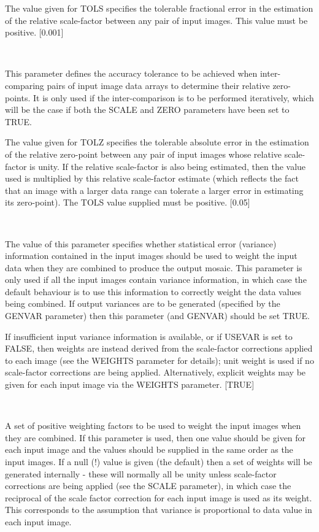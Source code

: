 \documentclass[twoside,11pt]{article}
\renewcommand{\_}{\texttt{\symbol{95}}}
\newcommand{\sstsubsection}[1]{ \item[{#1}] \mbox{} \\}
\newcommand{\sstsubsection}[1]{\item[{#1}]}
\begin{document}
{{{         The value given for TOLS specifies the tolerable fractional
         error in the estimation of the relative scale-factor between
         any pair of input images. This value must be positive.
         [0.001]
      }
      \sstsubsection{
         TOLZ = \_REAL (Read)
      } {
         This parameter defines the accuracy tolerance to be achieved
         when inter-comparing pairs of input image data arrays to
         determine their relative zero-points. It is only used if the
         inter-comparison is to be performed iteratively, which will be
         the case if both the SCALE and ZERO parameters have been set
         to TRUE.

         The value given for TOLZ specifies the tolerable absolute
         error in the estimation of the relative zero-point between any
         pair of input images whose relative scale-factor is unity. If
         the relative scale-factor is also being estimated, then the
         value used is multiplied by this relative scale-factor
         estimate (which reflects the fact that an image with a larger
         data range can tolerate a larger error in estimating its
         zero-point). The TOLS value supplied must be positive.
         [0.05]
      }
      \sstsubsection{
         USEVAR = \_LOGICAL (Read)
      } {
         The value of this parameter specifies whether statistical
         error (variance) information contained in the input images
         should be used to weight the input data when they are combined
         to produce the output mosaic. This parameter is only used if
         all the input images contain variance information, in which case
         the default behaviour is to use this information to correctly
         weight the data values being combined. If output variances are
         to be generated (specified by the GENVAR parameter) then this
         parameter (and GENVAR) should be set TRUE.

         If insufficient input variance information is available, or if
         USEVAR is set to FALSE, then weights are instead derived from
         the scale-factor corrections applied to each image (see the
         WEIGHTS parameter for details); unit weight is used if no
         scale-factor corrections are being applied. Alternatively,
         explicit weights may be given for each input image via the
         WEIGHTS parameter.
         [TRUE]
      }
      \sstsubsection{
         WEIGHTS( ) = \_REAL (Read)
      } {
         A set of positive weighting factors to be used to weight the
         input images when they are combined. If this parameter is used,
         then one value should be given for each input image and the
         values should be supplied in the same order as the input images.
         If a null (!) value is given (the default) then a set of
         weights will be generated internally - these will normally all
         be unity unless scale-factor corrections are being applied
         (see the SCALE parameter), in which case the reciprocal of the
         scale factor correction for each input image is used as its
         weight. This corresponds to the assumption that variance is
         proportional to data value in each input image.

}}}
\end{document}
